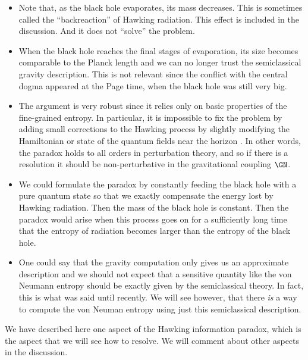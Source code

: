  \begin{itemize}
 \item
 Note that, as the black hole evaporates, its mass decreases. This is sometimes called the ``backreaction'' of Hawking radiation. This effect is included in the discussion. And it does not ``solve'' the problem.
 \item
 When the black hole reaches the final stages of evaporation, its size becomes comparable to the Planck length and we can no longer trust the semiclassical gravity description.  This is not relevant since the conflict with the central dogma appeared at the Page time, when the black hole was still very big. 
 \item The argument is very robust since it relies only on basic properties of the fine-grained entropy. In particular, it is impossible to fix the problem by adding small corrections to the Hawking process by slightly modifying the Hamiltonian or state of the quantum fields near the horizon \cite{Mathur:2009hf,Almheiri:2012rt,Almheiri:2013hfa}.  In other words, the paradox holds to all orders in perturbation theory, and so if there is a resolution it should be non-perturbative in the gravitational coupling $\GN$.
 \item
 We could formulate the paradox by constantly feeding the black hole with a pure quantum state	so that we exactly compensate the energy lost by Hawking radiation. Then the mass of the black hole is constant. Then the paradox would arise when this process goes on for a sufficiently long time that the entropy of radiation becomes larger than the entropy of the black hole. 
 \item
 One could say that the gravity computation only gives us an approximate description and we should not expect that a sensitive quantity like the von Neumann entropy should be exactly given by the  semiclassical theory. In fact, this is what was said until recently. We will see however, that there \emph{is} a way to compute the von Neuman entropy using just this semiclassical description. 
 \end{itemize}


 We have described here one aspect of the Hawking information paradox, which is the aspect that we will see how to resolve. We will comment about other aspects in the discussion.  
 

